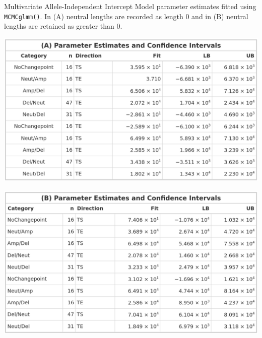 \begin{table}[!htb]
    \caption[Multivariate Allele-Independent Intercept Model parameter estimates fitted using \texttt{MCMCglmm()}.]{Multivariate Allele-Independent Intercept Model parameter estimates fitted using \texttt{MCMCglmm()}. In (A) neutral lengths are recorded as length 0 and in (B) neutral lengths are retained as greater than 0.}
     \begin{subtable}[t]{.49\textwidth}
      \centering
      \includegraphics[width = 1\textwidth]{../tables/Chapter_5/Multivariate_MCMC_7_AI_Pred.png}
    \end{subtable}%
    \hspace{0.5cm}
     \begin{subtable}[t]{.49\textwidth}
      \centering
         \includegraphics[width = 1\textwidth]{../tables/Chapter_5/Multivariate_MCMC_7_Neut_AI_Pred.png}
    \end{subtable} 
\end{table}

